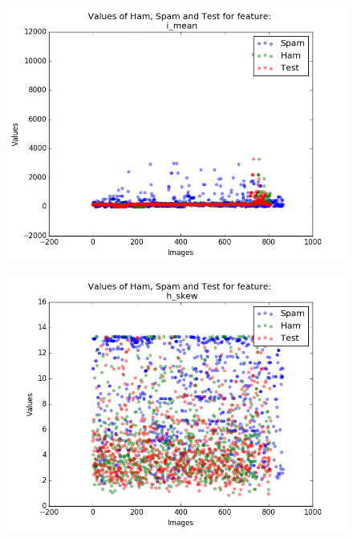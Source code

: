 \begin{figure}[h]
	\centering
	\begin{minipage}{.5\textwidth}
		\centering
		\includegraphics[width=\linewidth]{images/appA/i_mean_values_scatter}
		\label{fig:h_mean_values_scatter}
	\end{minipage}%
	\begin{minipage}{.5\textwidth}
		\centering
		\includegraphics[width=\linewidth]{images/appA/h_skew_values_scatter}
		\label{fig:h_skew_values_scatter}
	\end{minipage}
\end{figure}


